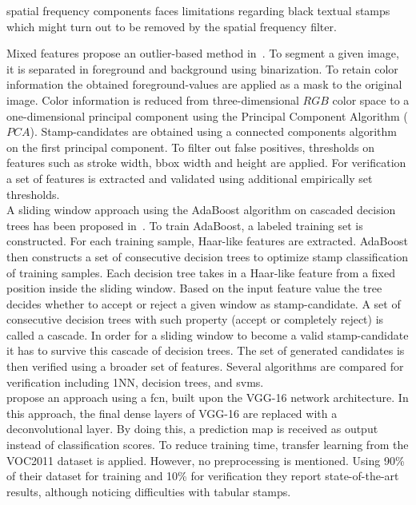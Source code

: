 \begin{description}
\begin{enumerate*}[label={\alph*)},font={\color{red!50!black}\bfseries}]
        spatial frequency components faces limitations regarding black textual 
        stamps which might turn out to be removed by the spatial frequency 
        filter.\\
        \item [Mixed features]
        \citeauthor*{Dey.2015} propose an outlier-based
        method in~\cite{Dey.2015}. To segment a given image,
        it is separated in foreground and background using binarization. To
        retain color information the obtained foreground-values are applied as
        a mask to the original image. Color information is reduced from
        three-dimensional \(RGB\) color space to a one-dimensional principal
        component using the Principal Component Algorithm (\(PCA\)).
        Stamp-candidates are obtained using a connected components algorithm on
        the first principal component. To filter out false positives,
        thresholds on features such as stroke width, \gls{bbox} width and
        height are applied. For verification a set of features is extracted and
        validated using additional empirically set thresholds.\\

        A sliding window approach using the AdaBoost algorithm on cascaded
        decision trees has been proposed in~\cite{Forczmanski.2016}. To train 
        AdaBoost, a labeled training set is constructed. For each training 
        sample, Haar-like features are extracted. AdaBoost then constructs a 
        set of consecutive decision trees to optimize stamp classification of 
        training samples. Each decision tree takes in a Haar-like feature from 
        a fixed position inside the sliding window. Based on the input feature 
        value the tree decides whether to accept or reject a given window as 
        stamp-candidate. A set of consecutive decision trees with such property 
        (accept or completely reject) is called a cascade. In order for a 
        sliding window to become a valid stamp-candidate it has to survive this 
        cascade of decision trees. The set of generated candidates is then 
        verified using a broader set of features. Several algorithms are 
        compared for verification including 1NN, decision trees, and \glspl{svm}.\\

        \textcite{Younas.2017} propose an approach using a \gls{fcn}, built upon
        the VGG-16 network architecture. In this approach, the final \glspl{dense layer}
        of VGG-16 are replaced with a \gls{deconvolutional layer}. By doing this,
        a prediction map is received as output instead of classification scores.
        To reduce training time, transfer learning from the VOC2011 dataset is
        applied. However, no preprocessing is mentioned. Using 90\% of their
        dataset for training and 10\% for verification they report 
        state-of-the-art results, although noticing difficulties with tabular
        stamps.
    \end{enumerate*}
\end{description}

